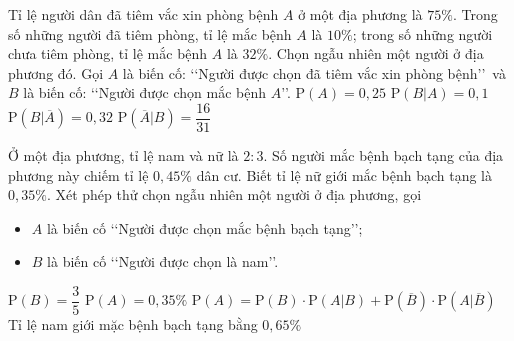 \begin{ex}%
	Tỉ lệ người dân đã tiêm vắc xin phòng bệnh $A$ ở một địa phương là $75\%$. Trong số những người đã tiêm phòng, tỉ lệ mắc bệnh $A$ là $10\%$; trong số những người chưa tiêm phòng, tỉ lệ mắc bệnh $A$ là $32\%$. Chọn ngẫu nhiên một người ở địa phương đó. Gọi $A$ là biến cố: \lq\lq  Người được chọn đã tiêm vắc xin phòng bệnh\rq\rq \, và $B$ là biến cố: \lq\lq  Người được chọn mắc bệnh $A$\rq\rq.
	\choiceTF
	{ $\mathrm{P}(A)=0{,}25$}
	{\True $\mathrm{P}\left(B|A\right)=0{,}1$}
	{\True $\mathrm{P}\left(B|\overline{A}\right)=0{,}32$}
	{ \True $\mathrm{P}\left(\overline{A}|B\right)=\dfrac{16}{31}$}
\end{ex}

\begin{ex}%
	Ở một địa phương, tỉ lệ nam và nữ là $2 : 3$. Số người mắc bệnh bạch tạng của địa phương này chiếm tỉ lệ $0{,}45\%$ dân cư. Biết tỉ lệ nữ giới mắc bệnh bạch tạng là $0{,}35\%$. Xét phép thử chọn ngẫu nhiên một người ở địa phương, gọi
	\begin{itemize}
	\item $A$ là biến cố \lq\lq  Người được chọn mắc bệnh bạch tạng\rq\rq;
	\item $B$ là biến cố \lq\lq  Người được chọn là nam\rq\rq.
	\end{itemize}
	\choiceTF
	{ $\mathrm{P}(B)=\dfrac{3}{5}$}
	{$\mathrm{P}(A)=0{,}35\%$}
	{\True $\mathrm{P}(A) = \mathrm{P}(B)\cdot \mathrm{P}(A|B) + \mathrm{P}\left(\overline{B}\right)\cdot \mathrm{P}\left(A|\overline{B}\right)$}
	{\True Tỉ lệ nam giới mặc bệnh bạch tạng bằng $0{,}65\%$}
\end{ex}

